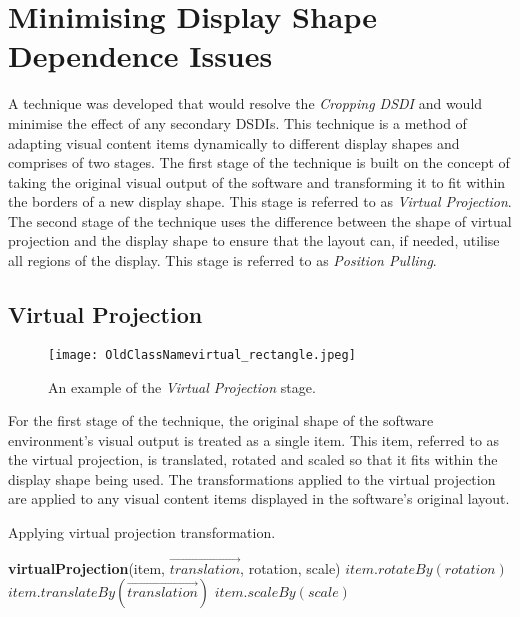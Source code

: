 \documentclass[review,5p,times,twocolumn]{elsarticle}
\newcommand{\INDSTATE}[1][1]{\STATE\hspace{#1\algorithmicindent}}
\begin{document}
\section{Minimising Display Shape Dependence Issues}
\label{sec:solution}

A technique was developed that would resolve the {\emph{Cropping \ac{DSDI}}} and would minimise the effect of any secondary \acp{DSDI}.
This technique is a method of adapting visual content items dynamically to different display shapes and comprises of two stages.
The first stage of the technique is built on the concept of taking the original visual output of the software and transforming it to fit within the borders of a new display shape.
This stage is referred to as {\em Virtual Projection}.
The second stage of the technique uses the difference between the shape of virtual projection and the display shape to ensure that the layout can, if needed, utilise all regions of the display.
This stage is referred to as {\em Position Pulling}.


\subsection{Virtual Projection}
\label{subsec:virtualprojection}

\begin{figure}[h]
 \centering
   \texttt{[image: OldClassNamevirtual\_rectangle.jpeg]}
   \caption{An example of the {\emph{Virtual Projection}} stage.}
   \label{fig:virtualRectangle}
\end{figure}

For the first stage of the technique, the original shape of the software environment's visual output is treated as a single item.
This item, referred to as the virtual projection, is translated, rotated and scaled so that it fits within the display shape being used.
The transformations applied to the virtual projection are applied to any visual content items displayed in the software's original layout.

\begin{algorithm}[h]
\caption{Applying virtual projection transformation.}
\label{algo:virtualProjection}
\begin{algorithmic}
\STATE \textbf{virtualProjection}(item, $\overrightarrow{translation}$, rotation, scale)
\INDSTATE[2]$item.rotateBy(rotation)$
\INDSTATE[2]$item.translateBy(\overrightarrow{translation})$
\INDSTATE[2]$item.scaleBy(scale)$
\end{algorithmic}
\end{algorithm}
\end{document}
